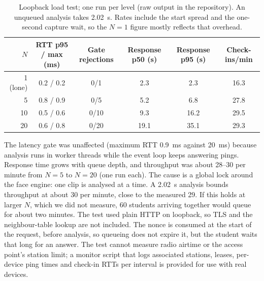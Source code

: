 \documentclass[11pt,a4paper]{article}
\begin{document}
\begin{table}[t]
\centering
\small
\begin{tabular}{@{}rccccc@{}}
\toprule
$N$ & RTT p95 / max (ms) & Gate rejections & Response p50 (s) & Response p95 (s) & Check-ins/min \\
\midrule
1 (lone)  & 0.2 / 0.2 & 0/1  & 2.3  & 2.3  & 16.3 \\
5         & 0.8 / 0.9 & 0/5  & 5.2  & 6.8  & 27.8 \\
10        & 0.5 / 0.6 & 0/10 & 9.3  & 16.2 & 29.5 \\
20        & 0.6 / 0.8 & 0/20 & 19.1 & 35.1 & 29.3 \\
\bottomrule
\end{tabular}
\caption{Loopback load test; one run per level (raw output in the repository). An unqueued analysis takes 2.02~s. Rates include the start spread and the one-second capture wait, so the $N=1$ figure mostly reflects that overhead.}
\label{tab:load}
\end{table}

The latency gate was unaffected (maximum RTT 0.9~ms against 20~ms) because analysis runs in worker threads while the event loop keeps answering pings. Response time grows with queue depth, and throughput was about 28--30 per minute from $N=5$ to $N=20$ (one run each). The cause is a global lock around the face engine: one clip is analysed at a time. A 2.02~s analysis bounds throughput at about 30 per minute, close to the measured 29. If this holds at larger $N$, which we did not measure, 60 students arriving together would queue for about two minutes. The test used plain HTTP on loopback, so TLS and the neighbour-table lookup are not included. The nonce is consumed at the start of the request, before analysis, so queueing does not expire it, but the student waits that long for an answer. The test cannot measure radio airtime or the access point's station limit; a monitor script that logs associated stations, leases, per-device ping times and check-in RTTs per interval is provided for use with real devices.
\end{document}
